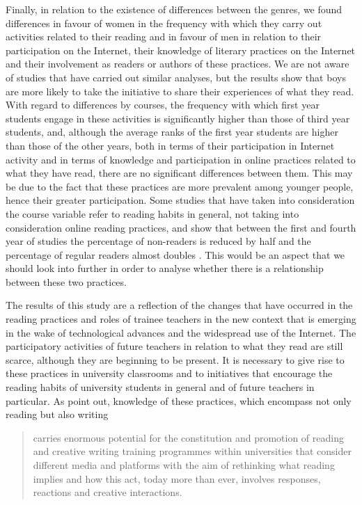\documentclass[english]{textolivre}
\begin{document}
Finally, in relation to the existence of differences between the genres, we found differences in favour of women in the frequency with which they carry out activities related to their reading and in favour of men in relation to their participation on the Internet, their knowledge of literary practices on the Internet and their involvement as readers or authors of these practices. We are not aware of studies that have carried out similar analyses, but the results show that boys are more likely to take the initiative to share their experiences of what they read. With regard to differences by courses, the frequency with which first year students engage in these activities is significantly higher than those of third year students, and, although the average ranks of the first year students are higher than those of the other years, both in terms of their participation in Internet activity and in terms of knowledge and participation in online practices related to what they have read, there are no significant differences between them. This may be due to the fact that these practices are more prevalent among younger people, hence their greater participation. Some studies that have taken into consideration the course variable refer to reading habits in general, not taking into consideration online reading practices, and show that between the first and fourth year of studies the percentage of non-readers is reduced by half and the percentage of regular readers almost doubles \cite{trigo_habitos_2020}. This would be an aspect that we should look into further in order to analyse whether there is a relationship between these two practices.

The results of this study are a reflection of the changes that have occurred in the reading practices and roles of trainee teachers in the new context that is emerging in the wake of technological advances and the widespread use of the Internet. The participatory activities of future teachers in relation to what they read are still scarce, although they are beginning to be present. It is necessary to give rise to these practices in university classrooms and to initiatives that encourage the reading habits of university students in general and of future teachers in particular. As \textcite[p. 13]{alcocer_vazquez_practicas_2021} point out, knowledge of these practices, which encompass not only reading but also writing

\begin{quote}
    carries enormous potential for the constitution and promotion of reading and creative writing training programmes within universities that consider different media and platforms with the aim of rethinking what reading implies and how this act, today more than ever, involves responses, reactions and creative interactions.
\end{quote}
\end{document}
